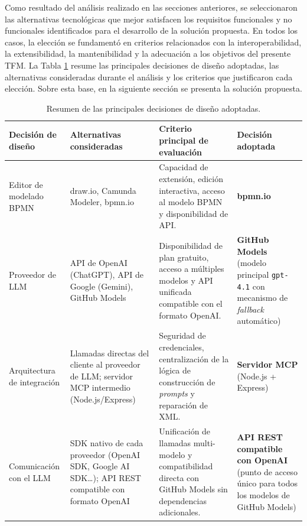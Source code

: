 {{Como resultado del análisis realizado en las secciones anteriores, se seleccionaron las alternativas tecnológicas que mejor satisfacen los requisitos funcionales y no funcionales identificados para el desarrollo de la solución propuesta. En todos los casos, la elección se fundamentó en criterios relacionados con la interoperabilidad, la extensibilidad, la mantenibilidad y la adecuación a los objetivos del presente TFM. La Tabla \ref{tab:design_decisions} resume las principales decisiones de diseño adoptadas, las alternativas consideradas durante el análisis y los criterios que justificaron cada elección. Sobre esta base, en la siguiente sección se presenta la solución propuesta.}


\begin{table}[htbp]
\centering
\caption{Resumen de las principales decisiones de diseño adoptadas.}
\label{tab:design_decisions}
\renewcommand{\arraystretch}{1.25}
\footnotesize
\begin{tabularx}{\textwidth}{|p{3.1cm}|X|X|p{3.1cm}|}
\hline
\textbf{Decisión de diseño} &
\textbf{Alternativas consideradas} &
\textbf{Criterio principal de evaluación} &
\textbf{Decisión adoptada} \\
\hline

Editor de modelado BPMN &
draw.io, Camunda Modeler, bpmn.io &
Capacidad de extensión, edición interactiva, acceso al modelo BPMN y disponibilidad de API. &
\textbf{bpmn.io} \\
\hline

Proveedor de LLM &
API de OpenAI (ChatGPT), API de Google (Gemini), GitHub Models &
Disponibilidad de plan gratuito, acceso a múltiples modelos y API unificada compatible con el formato OpenAI. &
\textbf{GitHub Models} (modelo principal \texttt{gpt-4.1} con mecanismo de \textit{fallback} automático) \\
\hline

Arquitectura de integración &
Llamadas directas del cliente al proveedor de LLM; servidor MCP intermedio (Node.js/Express) &
Seguridad de credenciales, centralización de la lógica de construcción de \textit{prompts} y reparación de XML. &
\textbf{Servidor MCP} (Node.js + Express) \\
\hline

Comunicación con el LLM &
SDK nativo de cada proveedor (OpenAI SDK, Google AI SDK\ldots); API REST compatible con formato OpenAI &
Unificación de llamadas multi-modelo y compatibilidad directa con GitHub Models sin dependencias adicionales. &
\textbf{API REST compatible con OpenAI} (punto de acceso único para todos los modelos de GitHub Models) \\
\hline


\end{tabularx}
\end{table}}
